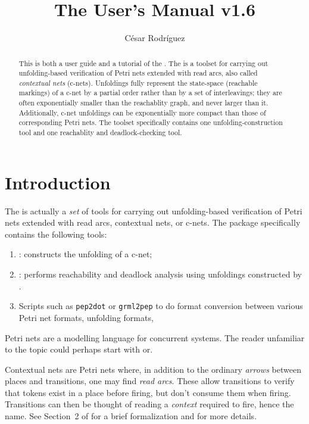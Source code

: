 \documentclass[a4paper]{refart}
\title{The \cunft{} User's Manual \hfill v1.6}
\author{C\'esar Rodr\'iguez}
\begin{document}
\maketitle

\begin{abstract}
This is both a user guide and a tutorial of the \cunft{}.
The \cunft{} is a toolset for carrying out unfolding-based
verification of Petri nets extended with read arcs, also called
\emph{contextual nets} (c-nets).
Unfoldings fully represent the state-space (reachable markings) of a c-net
by a partial order rather than by a set of interleavings;
they are often exponentially smaller than the reachablity graph, and never
larger than it.
Additionally, c-net unfoldings can be exponentially more compact than
those of corresponding Petri nets.
The toolset specifically contains one unfolding-construction
tool and one reachablity and deadlock-checking tool.
\end{abstract}

\tableofcontents

\section{Introduction}%
\label{s:intro}

The \emph{\cunft{}} is actually a \emph{set}
of tools for carrying out unfolding-based
verification of Petri nets extended with read arcs, \aka contextual
nets, or c-nets.  The package specifically contains the following tools:
\begin{enumerate}
\item
  \cunf: constructs the unfolding of a c-net;
\item
  \cna: performs reachability and deadlock analysis using unfoldings
  constructed by \cunf.
\item
  Scripts such as \verb!pep2dot! or \verb!grml2pep! to do format conversion
  between various Petri net formats, unfolding formats, \etc
\end{enumerate}

Petri nets are a modelling language for concurrent systems.
The reader unfamiliar to the topic could perhaps start with\cite{wiki:pn}
or\cite{Mur89}.

Contextual nets are Petri nets where, in addition to the ordinary
\textit{arrows} between places and transitions, one may find
\emph{read arcs}.
These allow transitions to verify that
tokens exist in a place before firing, but don't consume them
when firing.
Transitions can then be thought of reading a
\emph{context} required to fire, hence the name.
See Section~2 of\cite{BBCKRS12} for a brief formalization
and\cite{MR95} for more details.
\end{document}

